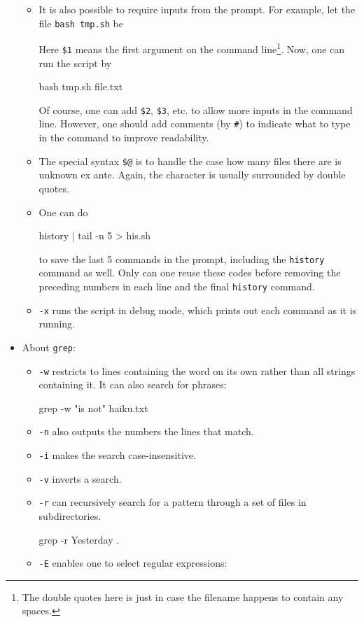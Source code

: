 \documentclass[UTF8]{book}
\newcommand{\code}[1]{\colorbox{codegray}{\texttt{#1}}}
\begin{document}
\begin{itemize}
\begin{itemize}
	\item It is also possible to require inputs from the prompt. For example, let the file \code{bash tmp.sh} be
	Here \code{\$1} means the first argument on the command line\footnote{The double quotes here is just in case the filename happens to contain any spaces.}. Now, one can run the script by
	\begin{bash}
bash tmp.sh file.txt
	\end{bash}
	Of course, one can add \code{\$2}, \code{\$3}, etc. to allow more inputs in the command line. However, one should add comments (by \code{\#}) to indicate what to type in the command to improve readability.
	\item The special syntax \code{\$@} is to handle the case how many files there are is unknown ex ante. Again, the character is usually surrounded by double quotes.
	\item One can do
	\begin{bash}
history | tail -n 5 > his.sh
	\end{bash}
	to save the last 5 commands in the prompt, including the \code{history} command as well. Only can one reuse these codes before removing the preceding numbers in each line and the final \code{history} command.
	\item \code{-x} runs the script in debug mode, which prints out each command as it is running.
\end{itemize}
\item About \code{grep}:
\begin{itemize}
	\item \code{-w} restricts to lines containing the word on its own rather than all strings containing it. It can also search for phrases:
	\begin{bash}
grep -w "is not" haiku.txt
	\end{bash}
	\item \code{-n} also outputs the numbers the lines that match.
	\item \code{-i} makes the search case-insensitive.
	\item \code{-v} inverts a search.
	\item \code{-r} can recursively search for a pattern through a set of files in subdirectories.
	\begin{bash}
grep -r Yesterday .
	\end{bash}
	\item \code{-E} enables one to select regular expressions:

\end{itemize}
\end{itemize}
\end{document}
